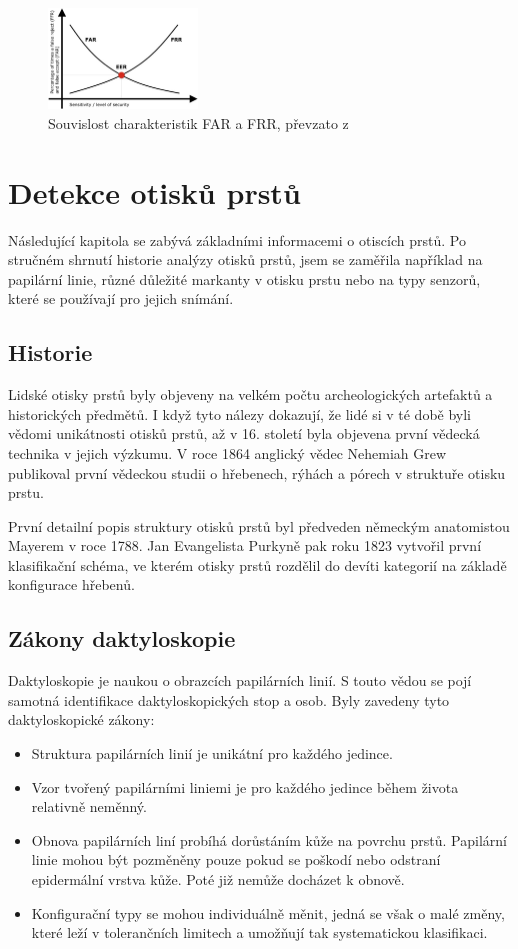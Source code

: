 \begin{figure}[!htbp]
    \centering
    \includegraphics[width=150px]{obrazky-figures/frrfar.jpeg}
    \caption{Souvislost charakteristik FAR a FRR, převzato z \cite{FARFRR}}
\end{figure}

\chapter{Detekce otisků prstů}
Následující kapitola se zabývá základními informacemi o otiscích prstů. Po stručném shrnutí historie analýzy otisků prstů, jsem se zaměřila například na papilární linie, různé důležité markanty v otisku prstu nebo na typy senzorů, které se používají pro jejich snímání.
\section{Historie}
Lidské otisky prstů byly objeveny na velkém počtu archeologických artefaktů a historických předmětů. I když tyto nálezy dokazují, že lidé si v té době byli vědomi unikátnosti otisků prstů, až v 16. století byla objevena první vědecká technika v jejich výzkumu. V roce 1864 anglický vědec Nehemiah Grew publikoval první vědeckou studii o hřebenech, rýhách a pórech v struktuře otisku prstu.

První detailní popis struktury otisků prstů byl předveden německým anatomistou Mayerem v roce 1788. Jan Evangelista Purkyně pak roku 1823 vytvořil první klasifikační schéma, ve kterém otisky prstů rozdělil do devíti kategorií na základě konfigurace hřebenů. \cite{Maltoni2009}

\section{Zákony daktyloskopie}
Daktyloskopie je naukou o obrazcích papilárních linií. S touto vědou se pojí samotná identifikace daktyloskopických stop a osob. \cite{PolicieDaktyloskopie} Byly zavedeny tyto daktyloskopické zákony: \cite{Drahansky}
\begin{itemize}
    \item Struktura papilárních linií je unikátní pro každého jedince.
    \item Vzor tvořený papilárními liniemi je pro každého jedince během života relativně neměnný.
    \item Obnova papilárních liní probíhá dorůstáním kůže na povrchu prstů. Papilární linie mohou být pozměněny pouze pokud se poškodí nebo odstraní epidermální vrstva kůže. Poté již nemůže docházet k obnově.
    \item Konfigurační typy se mohou individuálně měnit, jedná se však o malé změny, které leží v tolerančních limitech a umožňují tak systematickou klasifikaci.
\end{itemize}

